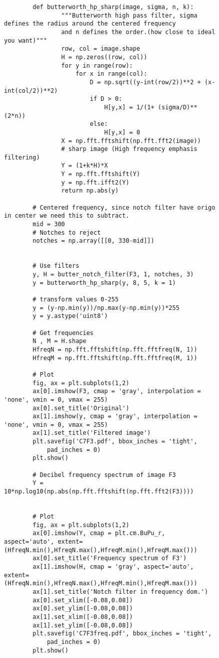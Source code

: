 {\begin{figure}[hbt!]
\begin{lstlisting}
        def butterworth_hp_sharp(image, sigma, n, k):
                """Butterworth high pass filter, sigma defines the radius around the centered frequency
                and n defines the order.(how close to ideal you want)"""
                row, col = image.shape
                H = np.zeros((row, col))
                for y in range(row):
                    for x in range(col):
                        D = np.sqrt((y-int(row/2))**2 + (x-int(col/2))**2)
                        if D > 0:
                            H[y,x] = 1/(1+ (sigma/D)**(2*n))
                        else:
                            H[y,x] = 0
                X = np.fft.fftshift(np.fft.fft2(image))
                # sharp image (High frequency emphasis filtering)
                Y = (1+k*H)*X
                Y = np.fft.fftshift(Y)
                y = np.fft.ifft2(Y)
                return np.abs(y)
        
        # Centered frequency, since notch filter have origo in center we need this to subtract.
        mid = 300
        # Notches to reject
        notches = np.array([[0, 330-mid]])
        
        
        # Use filters
        y, H = butter_notch_filter(F3, 1, notches, 3)
        y = butterworth_hp_sharp(y, 8, 5, k = 1)
        
        # transform values 0-255
        y = (y-np.min(y))/np.max(y-np.min(y))*255
        y = y.astype('uint8')
        
        # Get frequencies
        N , M = H.shape
        HfreqN = np.fft.fftshift(np.fft.fftfreq(N, 1))
        HfreqM = np.fft.fftshift(np.fft.fftfreq(M, 1))
        
        # Plot
        fig, ax = plt.subplots(1,2)
        ax[0].imshow(F3, cmap = 'gray', interpolation = 'none', vmin = 0, vmax = 255)
        ax[0].set_title('Original')
        ax[1].imshow(y, cmap = 'gray', interpolation = 'none', vmin = 0, vmax = 255)
        ax[1].set_title('Filtered image')
        plt.savefig('C7F3.pdf', bbox_inches = 'tight',
            pad_inches = 0)
        plt.show()
        
        # Decibel frequency spectrum of image F3
        Y = 10*np.log10(np.abs(np.fft.fftshift(np.fft.fft2(F3))))
        
        
        # Plot
        fig, ax = plt.subplots(1,2)
        ax[0].imshow(Y, cmap = plt.cm.BuPu_r, aspect='auto', extent=(HfreqN.min(),HfreqN.max(),HfreqM.min(),HfreqM.max()))
        ax[0].set_title('Frequency spectrum of F3')
        ax[1].imshow(H, cmap = 'gray', aspect='auto', extent=(HfreqN.min(),HfreqN.max(),HfreqM.min(),HfreqM.max()))
        ax[1].set_title('Notch filter in frequency dom.')
        ax[0].set_xlim([-0.08,0.08])
        ax[0].set_ylim([-0.08,0.08])
        ax[1].set_xlim([-0.08,0.08])
        ax[1].set_ylim([-0.08,0.08])
        plt.savefig('C7F3freq.pdf', bbox_inches = 'tight',
            pad_inches = 0)
        plt.show()


\end{lstlisting}
\end{figure}}
